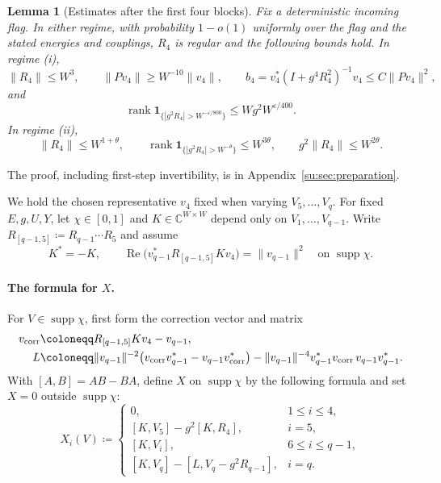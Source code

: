 \documentclass[11pt]{article}
\numberwithin{equation}{section}
\newtheorem{lemma}[theorem]{Lemma}
\theoremstyle{remark}
\newcommand{\C}{\mathbb C}
\newcommand{\supp}{\operatorname{supp}}
\newcommand{\rank}{\operatorname{rank}}
\newcommand{\one}{\mathbf 1}
\newcommand{\norm}[1]{\left\|#1\right\|}
\begin{document}
\begin{lemma}[Estimates after the first four blocks]\label{su:lem:preparation}
Fix a deterministic incoming flag. In either regime, with probability
$1-o(1)$ uniformly over the flag and the stated energies and couplings,
$R_4$ is regular and the following bounds hold.
In regime (i),
\begin{equation}\label{su:eq:prep}
 \norm{R_4}\le W^3,\qquad \|Pv_4\|\ge W^{-10}\|v_4\|,\qquad
 b_4=v_4^*(I+g^4R_4^2)^{-1}v_4\le C\|Pv_4\|^2,
\end{equation}
and
\begin{equation}\label{su:eq:prepared-large-rank}
 \rank\one_{\{|g^2R_4|>W^{-\varepsilon/800}\}}
 \le Wg^2W^{\varepsilon/400}.
\end{equation}
In regime (ii),
\begin{equation}\label{nc:eq:prepared}
 \norm{R_4}\le W^{1+\theta},\qquad
 \rank\one_{\{|g^2R_4|>W^{-\theta}\}}\le W^{3\theta},\qquad
 g^2\norm{R_4}\le W^{2\theta}.
\end{equation}
\end{lemma}
The proof, including first-step invertibility, is in
Appendix~\ref{su:sec:preparation}.

We hold the chosen representative $v_4$ fixed when varying
$V_5,\ldots,V_q$.
For fixed $E,g,U,Y$, let $\chi\in[0,1]$ and $K\in\C^{W\times W}$
depend only on $V_1,\ldots,V_{q-1}$.
Write $R_{[q-1,5]}\coloneqq R_{q-1}\cdots R_5$ and assume
\begin{equation}\label{su:eq:generator-normalization}
 K^*=-K,\qquad
 \operatorname{Re}\bigl(v_{q-1}^*R_{[q-1,5]}Kv_4\bigr)=\|v_{q-1}\|^2
       \quad\text{on }\supp\chi.
\end{equation}

\paragraph{The formula for $X$.}
For $V\in\supp\chi$, first form the correction vector and matrix
\begin{equation}\label{us:eq:L}
 \begin{aligned}
 v_{\rm corr}&\coloneqq R_{[q-1,5]}Kv_4-v_{q-1},\\
 L&\coloneqq
 \|v_{q-1}\|^{-2}\bigl(v_{\rm corr}v_{q-1}^*-v_{q-1}v_{\rm corr}^*\bigr)
 -\|v_{q-1}\|^{-4} v_{q-1}^*v_{\rm corr}\,v_{q-1}v_{q-1}^*.
 \end{aligned}
\end{equation}
With $[A,B]=AB-BA$, define $X$ on $\supp\chi$ by the following
formula and set $X=0$ outside $\supp\chi$:
\begin{equation}\label{us:eq:physical}
 \boxed{X_i(V)\coloneqq
 \begin{cases}
 0,&1\le i\le4,\\
 [K,V_5]-g^2[K,R_4],&i=5,\\
 [K,V_i],&6\le i\le q-1,\\
 [K,V_q]-[L,V_q-g^2R_{q-1}],&i=q.
 \end{cases}}
\end{equation}
\end{document}

